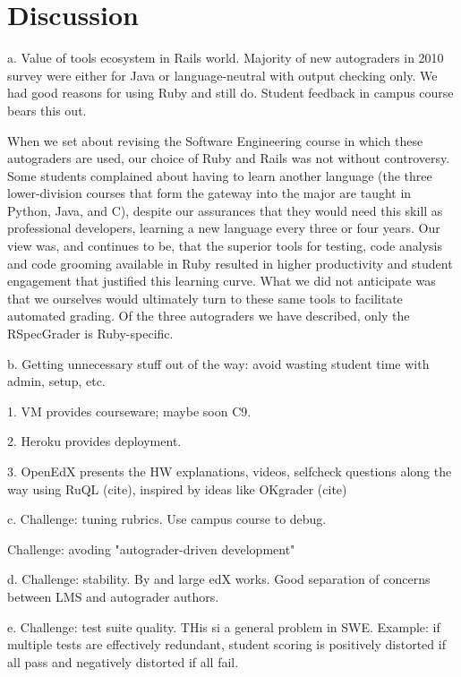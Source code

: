 \section{Discussion}



a.	Value of tools ecosystem in Rails world. Majority of new autograders in 2010 survey were either for Java or language-neutral with output checking only. We had good reasons for using Ruby and still do. Student feedback in campus course bears this out.


When we set about revising the Software Engineering course in which
these autograders are used, our choice of Ruby and Rails was not without
controversy.  Some students complained about having to learn another
language (the three lower-division courses that form the gateway into
the major are taught in Python, Java, and C), despite our assurances
that they would need this skill  as professional developers, learning a
new language every three or four years.  Our view was, and continues to
be, that the superior tools for testing, code analysis and code grooming
available in Ruby resulted in higher productivity and student engagement
that justified this learning curve.  What we did not anticipate was that
we ourselves would ultimately turn to these same tools to facilitate
automated grading.  Of the three autograders we have described, only the
RSpecGrader is Ruby-specific.



b.	Getting unnecessary stuff out of the way: avoid wasting student time with admin, setup, etc.  

1.	VM provides courseware; maybe soon C9.  

2.	Heroku provides deployment.  

3.	OpenEdX presents the HW explanations, videos, selfcheck questions along the way using RuQL (cite), inspired by ideas like OKgrader (cite)

c.	Challenge: tuning rubrics. Use campus course to debug.

Challenge: avoding "autograder-driven development"


d.	Challenge: stability. By and large edX works.  Good separation
of concerns between LMS and autograder authors.

e.	Challenge: test suite quality. THis si a general problem in SWE. Example: if multiple tests are effectively redundant, student scoring is positively distorted if all pass and negatively distorted if all fail.



